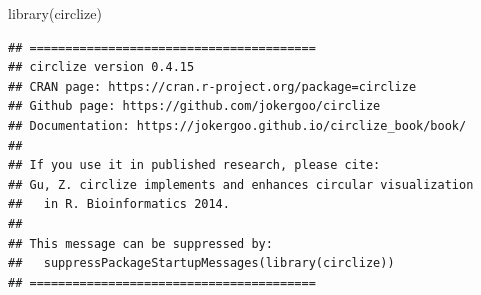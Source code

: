 \documentclass[
]{article}
\newenvironment{Shaded}{\begin{snugshade}}{\end{snugshade}}
\newcommand{\AttributeTok}[1]{\textcolor[rgb]{0.77,0.63,0.00}{#1}}
\newcommand{\ConstantTok}[1]{\textcolor[rgb]{0.00,0.00,0.00}{#1}}
\newcommand{\DecValTok}[1]{\textcolor[rgb]{0.00,0.00,0.81}{#1}}
\newcommand{\FloatTok}[1]{\textcolor[rgb]{0.00,0.00,0.81}{#1}}
\newcommand{\FunctionTok}[1]{\textcolor[rgb]{0.00,0.00,0.00}{#1}}
\newcommand{\NormalTok}[1]{#1}
\newcommand{\OtherTok}[1]{\textcolor[rgb]{0.56,0.35,0.01}{#1}}
\newcommand{\SpecialCharTok}[1]{\textcolor[rgb]{0.00,0.00,0.00}{#1}}
\newcommand{\StringTok}[1]{\textcolor[rgb]{0.31,0.60,0.02}{#1}}
\begin{document}
\begin{Shaded}
\begin{Highlighting}[]
\FunctionTok{library}\NormalTok{(circlize)}
\end{Highlighting}
\end{Shaded}

\begin{verbatim}
## ========================================
## circlize version 0.4.15
## CRAN page: https://cran.r-project.org/package=circlize
## Github page: https://github.com/jokergoo/circlize
## Documentation: https://jokergoo.github.io/circlize_book/book/
## 
## If you use it in published research, please cite:
## Gu, Z. circlize implements and enhances circular visualization
##   in R. Bioinformatics 2014.
## 
## This message can be suppressed by:
##   suppressPackageStartupMessages(library(circlize))
## ========================================
\end{verbatim}

\begin{Shaded}
\end{Shaded}
\end{document}
